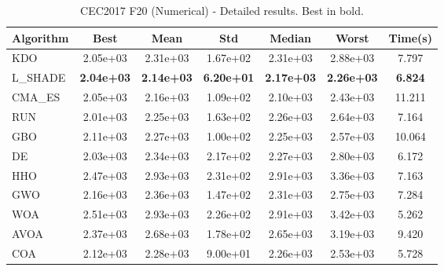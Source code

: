 \begin{table}[H]
\centering\small
\caption{CEC2017 F20 (Numerical) - Detailed results. Best in bold.}
\label{tab:cec2017_F20}
\begin{tabular}{lcccccc}
\toprule
\textbf{Algorithm} & \textbf{Best} & \textbf{Mean} & \textbf{Std} & \textbf{Median} & \textbf{Worst} & \textbf{Time(s)} \\
\midrule
KDO & 2.05e+03 & 2.31e+03 & 1.67e+02 & 2.31e+03 & 2.88e+03 & 7.797 \\
L_SHADE & \textbf{2.04e+03} & \textbf{2.14e+03} & \textbf{6.20e+01} & \textbf{2.17e+03} & \textbf{2.26e+03} & \textbf{6.824} \\
CMA_ES & 2.05e+03 & 2.16e+03 & 1.09e+02 & 2.10e+03 & 2.43e+03 & 11.211 \\
RUN & 2.01e+03 & 2.25e+03 & 1.63e+02 & 2.26e+03 & 2.64e+03 & 7.164 \\
GBO & 2.11e+03 & 2.27e+03 & 1.00e+02 & 2.25e+03 & 2.57e+03 & 10.064 \\
DE & 2.03e+03 & 2.34e+03 & 2.17e+02 & 2.27e+03 & 2.80e+03 & 6.172 \\
HHO & 2.47e+03 & 2.93e+03 & 2.31e+02 & 2.91e+03 & 3.36e+03 & 7.163 \\
GWO & 2.16e+03 & 2.36e+03 & 1.47e+02 & 2.31e+03 & 2.75e+03 & 7.284 \\
WOA & 2.51e+03 & 2.93e+03 & 2.26e+02 & 2.91e+03 & 3.42e+03 & 5.262 \\
AVOA & 2.37e+03 & 2.68e+03 & 1.78e+02 & 2.65e+03 & 3.19e+03 & 9.420 \\
COA & 2.12e+03 & 2.28e+03 & 9.00e+01 & 2.26e+03 & 2.53e+03 & 5.728 \\
\bottomrule
\end{tabular}
\end{table}
